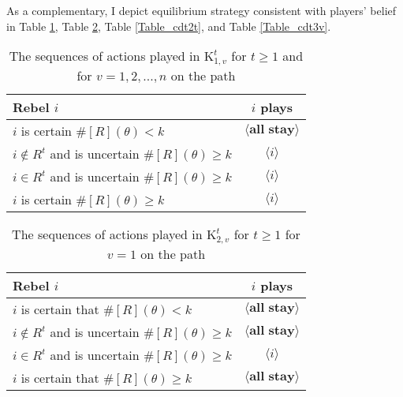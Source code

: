 \documentclass[12pt,letter]{article}
\newcommand{\Kappa}{\mathrm{K}}
\theoremstyle{definition}
\theoremstyle{remark}
\theoremstyle{claim}
\begin{document}
As a complementary, I depict equilibrium strategy consistent with players' belief in Table \ref{Table_cdt1v}, Table \ref{Table_cdt21}, Table \ref{Table_cdt2t}, and Table \ref{Table_cdt3v}.

\begin{table}[!htbp]
\caption{The sequences of actions played in $\Kappa^t_{1,v}$ for $t\geq 1$ and for $v=1,2,...,n$ on the path}
\label{Table_cdt1v}
\begin{center}
\begin{tabular}{l c}
Rebel $i$ 	 	&  	$i$ plays		 \\
\hline
\hline
$i$ is certain $\#[R](\theta)<k$ 	& 	$\langle \textbf{all stay} \rangle$	\\
$i\notin R^{t}$ and is uncertain $\#[R](\theta)\geq k$	& 	$\langle i \rangle$	\\
$i\in R^{t}$ and is uncertain $\#[R](\theta)\geq k$ &  $\langle i \rangle$  \\
$i$ is certain $\#[R](\theta)\geq k$ &  $\langle i \rangle$  \\
\hline
\end{tabular}
\end{center}
\end{table}


\begin{table}[!htbp]
\caption{The sequences of actions played in $\Kappa^t_{2,v}$ for $t\geq 1$ for $v=1$ on the path}
\label{Table_cdt21}
\begin{center}
\begin{tabular}{l c}
Rebel $i$ 	 	&  	$i$ plays		 \\
\hline
\hline
$i$ is certain that $\#[R](\theta)<k$ 	& 	$\langle \textbf{all stay} \rangle$	\\
$i\notin R^{t}$ and is uncertain $\#[R](\theta)\geq k$	& 	$\langle \textbf{all stay} \rangle$	\\
$i\in R^{t}$ and is uncertain $\#[R](\theta)\geq k$ &  $\langle i \rangle$  \\
$i$ is certain that $\#[R](\theta)\geq k$ &  $\langle \textbf{all stay} \rangle$  \\
\hline
\end{tabular}
\end{center}
\end{table}
\end{document}
